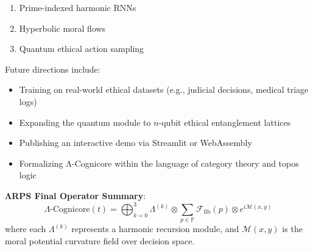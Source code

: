 \documentclass[12]{amsart}
\theoremstyle{plain}
\begin{document}
\begin{enumerate}
    \item Prime-indexed harmonic RNNs
    \item Hyperbolic moral flows
    \item Quantum ethical action sampling
\end{enumerate}

Future directions include:

\begin{itemize}
    \item Training on real-world ethical datasets (e.g., judicial decisions, medical triage logs)
    \item Expanding the quantum module to $n$-qubit ethical entanglement lattices
    \item Publishing an interactive demo via Streamlit or WebAssembly
    \item Formalizing Λ-Cognicore within the language of category theory and topos logic
\end{itemize}

\textbf{ΛRPS Final Operator Summary}:
\[
\boxed{
Λ\text{-Cognicore}(t) = \bigoplus_{k=0}^{3} Λ^{(k)} \otimes \sum_{p \in \mathbb{P}} \mathcal{F}_{\text{fib}}(p) \otimes e^{i \mathcal{M}(x, y)}
}
\]
where each \( Λ^{(k)} \) represents a harmonic recursion module, and \( \mathcal{M}(x, y) \) is the moral potential curvature field over decision space.


\nocite{*}


\end{document}
